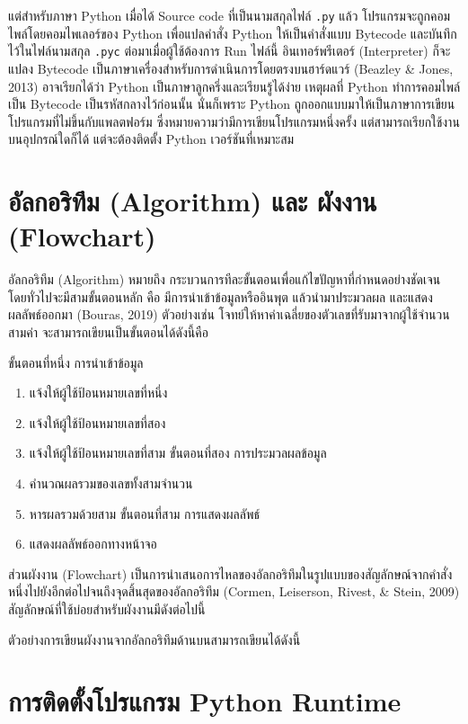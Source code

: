 แต่สำหรับภาษา Python เมื่อได้ Source code ที่เป็นนามสกุลไฟล์ \texttt{.py} แล้ว โปรแกรมจะถูกคอมไพล์โดยคอมไพเลอร์ของ Python เพื่อแปลคำสั่ง Python ให้เป็นคำสั่งแบบ Bytecode และบันทึกไว้ในไฟล์นามสกุล \texttt{.pyc} ต่อมาเมื่อผู้ใช้ต้องการ Run ไฟล์นี้ อินเทอร์พรีเตอร์ (Interpreter) ก็จะแปลง Bytecode เป็นภาษาเครื่องสำหรับการดำเนินการโดยตรงบนฮาร์ดแวร์ (Beazley \& Jones, 2013) อาจเรียกได้ว่า Python เป็นภาษาลูกครึ่งและเรียนรู้ได้ง่าย เหตุผลที่ Python ทำการคอมไพล์เป็น Bytecode เป็นรหัสกลางไว้ก่อนนั้น นั่นก็เพราะ Python ถูกออกแบบมาให้เป็นภาษาการเขียนโปรแกรมที่ไม่ขึ้นกับแพลตฟอร์ม ซึ่งหมายความว่ามีการเขียนโปรแกรมหนึ่งครั้ง แต่สามารถเรียกใช้งานบนอุปกรณ์ใดก็ได้ แต่จะต้องติดตั้ง Python เวอร์ชันที่เหมาะสม 

\section{อัลกอริทึม (Algorithm) และ ผังงาน (Flowchart)}

อัลกอริทึม (Algorithm) หมายถึง กระบวนการทีละขั้นตอนเพื่อแก้ไขปัญหาที่กำหนดอย่างชัดเจน โดยทั่วไปจะมีสามขั้นตอนหลัก คือ มีการนำเข้าข้อมูลหรืออินพุต แล้วนำมาประมวลผล และแสดงผลลัพธ์ออกมา (Bouras, 2019) ตัวอย่างเช่น โจทย์ให้หาค่าเฉลี่ยของตัวเลขที่รับมาจากผู้ใช้จำนวนสามค่า จะสามารถเขียนเป็นขั้นตอนได้ดังนี้คือ

ขั้นตอนที่หนึ่ง การนำเข้าข้อมูล
\begin{enumerate}[noitemsep]
\item แจ้งให้ผู้ใช้ป้อนหมายเลขที่หนึ่ง
\item แจ้งให้ผู้ใช้ป้อนหมายเลขที่สอง
\item แจ้งให้ผู้ใช้ป้อนหมายเลขที่สาม
ขั้นตอนที่สอง การประมวลผลข้อมูล
\item คำนวณผลรวมของเลขทั้งสามจำนวน
\item หารผลรวมด้วยสาม
ขั้นตอนที่สาม การแสดงผลลัพธ์
\item แสดงผลลัพธ์ออกทางหน้าจอ
\end{enumerate}

ส่วนผังงาน (Flowchart) เป็นการนำเสนอการไหลของอัลกอริทึมในรูปแบบของสัญลักษณ์จากคำสั่งหนึ่งไปยังอีกต่อไปจนถึงจุดสิ้นสุดของอัลกอริทึม (Cormen, Leiserson, Rivest, \& Stein, 2009) สัญลักษณ์ที่ใช้บ่อยสำหรับผังงานมีดังต่อไปนี้

ตัวอย่างการเขียนผังงานจากอัลกอริทึมด้านบนสามารถเขียนได้ดังนี้

\section{การติดตั้งโปรแกรม Python Runtime}

